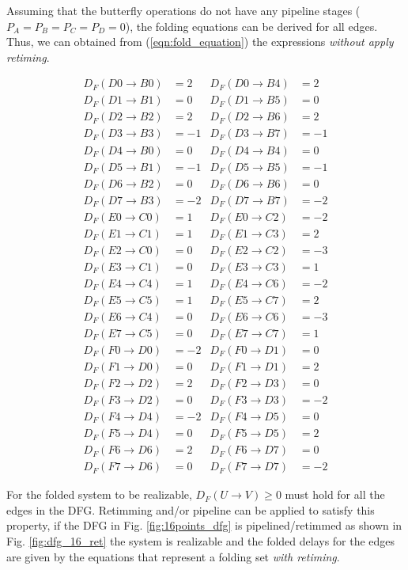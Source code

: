 \documentclass[journal,comsoc]{IEEEtran}
\begin{document}
Assuming that the butterfly operations do not have any pipeline stages ($P_A=P_B=P_C=P_D=0$), the folding equations can be derived for all edges. Thus, we can obtained from (\ref{eqn:fold_equation}) the expressions \textit{without apply retiming}.
\begin{small}
\begin{align*}
D_F(D0\to B0)&=2 &  D_F(D0\to B4)&=2\\
D_F(D1\to B1)&=0 &  D_F(D1\to B5)&=0\\
D_F(D2\to B2)&=2 &  D_F(D2\to B6)&=2\\
D_F(D3\to B3)&=-1& D_F(D3\to B7)&=-1\\
D_F(D4\to B0)&=0 &  D_F(D4\to B4)&=0\\
D_F(D5\to B1)&=-1& D_F(D5\to B5)&=-1\\
D_F(D6\to B2)&=0 &  D_F(D6\to B6)&=0\\
D_F(D7\to B3)&=-2& D_F(D7\to B7)&=-2\\
D_F(E0\to C0)&=1 &  D_F(E0\to C2)&=-2\\
D_F(E1\to C1)&=1 &  D_F(E1\to C3)&=2\\
D_F(E2\to C0)&=0 &  D_F(E2\to C2)&=-3\\
D_F(E3\to C1)&=0 &  D_F(E3\to C3)&=1\\
D_F(E4\to C4)&=1 &  D_F(E4\to C6)&=-2\\
D_F(E5\to C5)&=1 &  D_F(E5\to C7)&=2\\
D_F(E6\to C4)&=0 &  D_F(E6\to C6)&=-3\\
D_F(E7\to C5)&=0 &  D_F(E7\to C7)&=1\\
D_F(F0\to D0)&=-2& D_F(F0\to D1)&=0\\
D_F(F1\to D0)&=0 &  D_F(F1\to D1)&=2\\
D_F(F2\to D2)&=2 &  D_F(F2\to D3)&=0\\
D_F(F3\to D2)&=0 &  D_F(F3\to D3)&=-2\\
D_F(F4\to D4)&=-2&  D_F(F4\to D5)&=0\\
D_F(F5\to D4)&=0 &  D_F(F5\to D5)&=2\\
D_F(F6\to D6)&=2 &  D_F(F6\to D7)&=0\\
D_F(F7\to D6)&=0 &  D_F(F7\to D7)&=-2
\end{align*}
\end{small}
For the folded system to be realizable, $D_F(U\to V)\geq0$ must hold for all the edges in the DFG. Retimming and/or pipeline can be applied to satisfy this property, if the DFG in Fig. \ref{fig:16points_dfg} is pipelined/retimmed as shown in Fig. \ref{fig:dfg_16_ret} the system is realizable and the folded delays for the edges are given by the equations that represent a folding set \textit{with retiming}.
\end{document}
